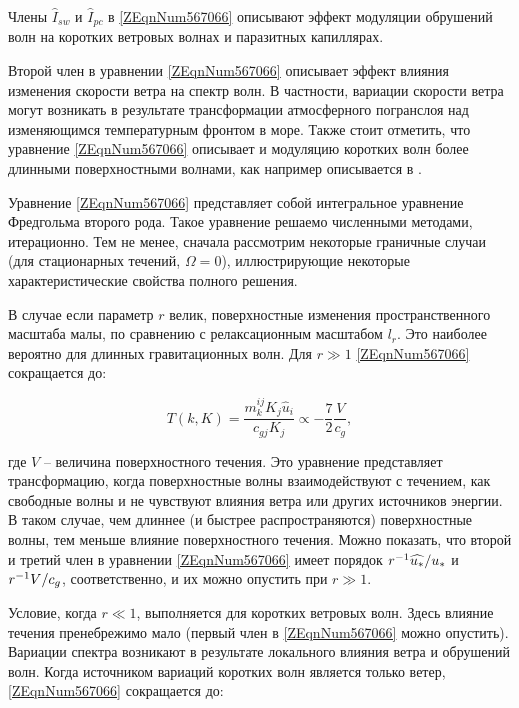 Члены $\widehat{I}_{sw} $ и $\widehat{I}_{pc} $ в \eqref{ZEqnNum567066} описывают эффект модуляции обрушений волн на коротких ветровых волнах и паразитных капиллярах.

Второй член в уравнении \eqref{ZEqnNum567066} описывает эффект влияния изменения скорости ветра на спектр волн. В частности, вариации скорости ветра могут возникать в результате трансформации атмосферного погранслоя над изменяющимся температурным фронтом в море. Также стоит отметить, что уравнение \eqref{ZEqnNum567066} описывает и модуляцию коротких волн более длинными поверхностными волнами, как например описывается в \citep{Kudryavtsev2003}.

Уравнение \eqref{ZEqnNum567066} представляет собой интегральное уравнение Фредгольма второго рода. Такое уравнение решаемо численными методами, итерационно. Тем не менее, сначала рассмотрим некоторые граничные случаи (для стационарных течений, $\Omega =0$), иллюстрирующие некоторые характеристические свойства полного решения.

В случае если параметр $r$ велик, поверхностные изменения пространственного масштаба малы, по сравнению с релаксационным масштабом $l_{r} $. Это наиболее вероятно для длинных гравитационных волн. Для $r\gg 1$ \eqref{ZEqnNum567066} сокращается до:



\begin{equation} \label{1.40)} T\left(k,K\right)=\frac{m_{k}^{ij} K_{j} \widehat{u}_{i} }{c_{gj} K_{j} } \propto -\frac{7}{2} \frac{V}{c_{g} } ,  \end{equation} 



\noindent где $V$ -- величина поверхностного течения. Это уравнение представляет трансформацию, когда поверхностные волны взаимодействуют с течением, как свободные волны и не чувствуют влияния ветра или других источников энергии. В таком случае, чем длиннее (и быстрее распространяются) поверхностные волны, тем меньше влияние поверхностного течения. Можно показать, что второй и третий член в уравнении \eqref{ZEqnNum567066} имеет порядок $r^{-1} {\widehat{u_{*} }\mathord{\left/ {\vphantom {\widehat{u_{*} } u_{*} }} \right. \kern-\nulldelimiterspace} u_{*} } $ и $r^{-1} {V\mathord{\left/ {\vphantom {V c_{g} }} \right. \kern-\nulldelimiterspace} c_{g} } $, соответственно, и их можно опустить при $r\gg 1$.

Условие, когда $r\ll 1$, выполняется для коротких ветровых волн. Здесь влияние течения пренебрежимо мало (первый член в \eqref{ZEqnNum567066} можно опустить). Вариации спектра возникают в результате локального влияния ветра и обрушений волн. Когда источником вариаций коротких волн является только ветер, \eqref{ZEqnNum567066} сокращается до:

